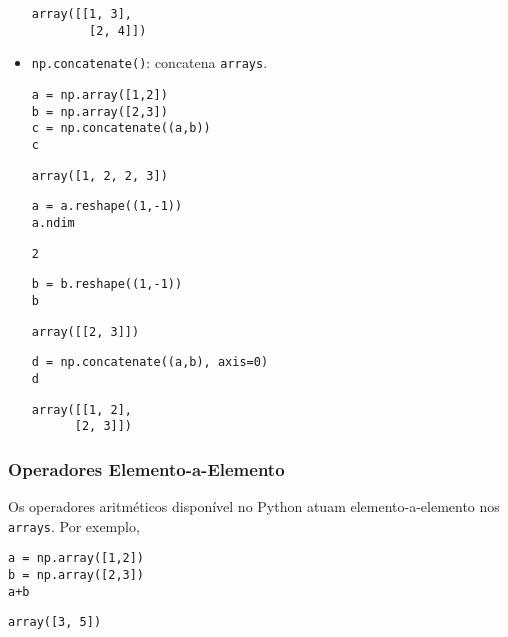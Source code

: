 \begin{itemize}
\begin{verbatim}
array([[1, 3],
        [2, 4]])
\end{verbatim}

\item \texttt{np.concatenate()}: concatena \texttt{arrays}.

\begin{lstlisting}
a = np.array([1,2])
b = np.array([2,3])
c = np.concatenate((a,b))
c
\end{lstlisting}

\begin{verbatim}
array([1, 2, 2, 3])
\end{verbatim}

\begin{lstlisting}
a = a.reshape((1,-1))
a.ndim  
\end{lstlisting}

\begin{verbatim}
2
\end{verbatim}

\begin{lstlisting}
b = b.reshape((1,-1))
b
\end{lstlisting}

\begin{verbatim}
array([[2, 3]])
\end{verbatim}

\begin{lstlisting}
d = np.concatenate((a,b), axis=0)
d
\end{lstlisting}

\begin{verbatim}
array([[1, 2],
      [2, 3]])
\end{verbatim}

  \end{itemize}

\subsubsection{Operadores Elemento-a-Elemento}\label{subsubsection:ope-a-e}

Os operadores aritméticos disponível no Python atuam elemento-a-elemento nos \texttt{arrays}. Por exemplo,

\begin{lstlisting}
a = np.array([1,2])
b = np.array([2,3])
a+b
\end{lstlisting}

\begin{verbatim}
array([3, 5])
\end{verbatim}

